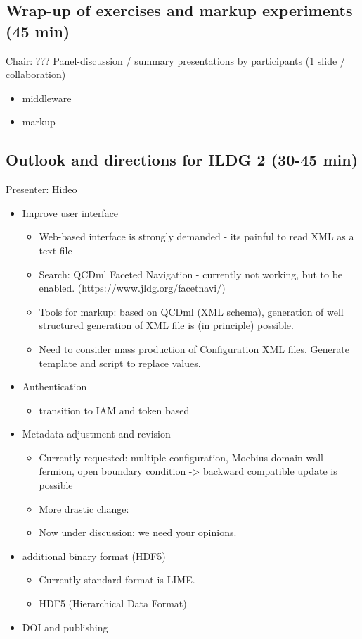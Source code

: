 \documentclass{article}
\begin{document}
\subsection{Wrap-up of exercises and markup experiments (45 min)}
Chair: ???
Panel-discussion / summary presentations by participants (1 slide / collaboration)
\begin{itemize}
    \item middleware
    \item markup
\end{itemize}

\subsection{Outlook and directions for ILDG 2 (30-45 min)}
Presenter: Hideo
\begin{itemize}
    \item Improve user interface
    \begin{itemize}
        \item Web-based interface is strongly demanded - its painful to read XML as a text file
        \item Search: QCDml Faceted Navigation - currently not working, but to be enabled.
        (https://www.jldg.org/facetnavi/)
        \item Tools for markup: based on QCDml (XML schema), generation of well structured generation of XML file is (in principle) possible.
        \item Need to consider mass production of Configuration XML files. Generate template and script to replace values.
    \end{itemize}
    \item Authentication
    \begin{itemize}
      \item transition to IAM and token based
    \end{itemize}
    \item Metadata adjustment and revision
    \begin{itemize}
        \item Currently requested: multiple configuration, Moebius domain-wall fermion, open boundary condition -> backward compatible update is possible
        \item More drastic change: 
        \item Now under discussion: we need your opinions.
    \end{itemize}
    \item additional binary format (HDF5)
    \begin{itemize}
      \item Currently standard format is LIME.
      \item HDF5 (Hierarchical Data Format)
    \end{itemize}
    \item DOI and publishing
\end{itemize}
\end{document}
